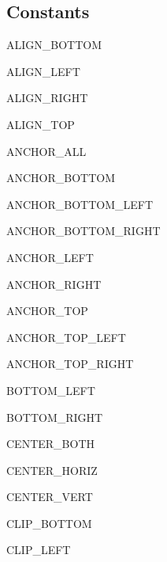 \subsection{Constants}
\begin{datadesc}{ALIGN_BOTTOM}
\end{datadesc}
\begin{datadesc}{ALIGN_LEFT}
\end{datadesc}
\begin{datadesc}{ALIGN_RIGHT}
\end{datadesc}
\begin{datadesc}{ALIGN_TOP}
\end{datadesc}
\begin{datadesc}{ANCHOR_ALL}
\end{datadesc}
\begin{datadesc}{ANCHOR_BOTTOM}
\end{datadesc}
\begin{datadesc}{ANCHOR_BOTTOM_LEFT}
\end{datadesc}
\begin{datadesc}{ANCHOR_BOTTOM_RIGHT}
\end{datadesc}
\begin{datadesc}{ANCHOR_LEFT}
\end{datadesc}
\begin{datadesc}{ANCHOR_RIGHT}
\end{datadesc}
\begin{datadesc}{ANCHOR_TOP}
\end{datadesc}
\begin{datadesc}{ANCHOR_TOP_LEFT}
\end{datadesc}
\begin{datadesc}{ANCHOR_TOP_RIGHT}
\end{datadesc}
\begin{datadesc}{BOTTOM_LEFT}
\end{datadesc}
\begin{datadesc}{BOTTOM_RIGHT}
\end{datadesc}
\begin{datadesc}{CENTER_BOTH}
\end{datadesc}
\begin{datadesc}{CENTER_HORIZ}
\end{datadesc}
\begin{datadesc}{CENTER_VERT}
\end{datadesc}
\begin{datadesc}{CLIP_BOTTOM}
\end{datadesc}
\begin{datadesc}{CLIP_LEFT}
\end{datadesc}
